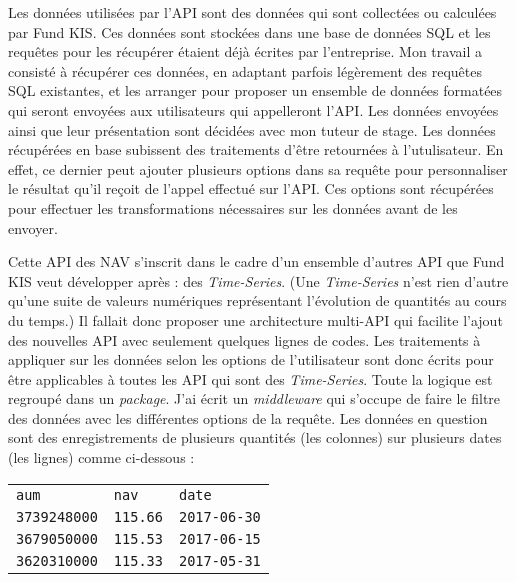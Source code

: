\vspace{3mm}

Les données utilisées par l'API sont des données qui sont collectées ou calculées par Fund KIS. Ces données sont stockées dans une base de données SQL et les requêtes pour les récupérer étaient déjà écrites par l'entreprise. Mon travail a consisté à récupérer ces données, en adaptant parfois légèrement des requêtes SQL existantes, et les arranger pour proposer un ensemble de données formatées qui seront envoyées aux utilisateurs qui appelleront l'API. Les données envoyées ainsi que leur présentation sont décidées avec mon tuteur de stage. Les données récupérées en base subissent des traitements d'être retournées à l'utulisateur. En effet, ce dernier peut ajouter plusieurs options dans sa requête pour personnaliser le résultat qu'il reçoit de l'appel effectué sur l'API. Ces options sont récupérées pour effectuer les transformations nécessaires sur les données avant de les envoyer.

\vspace{3mm}

Cette API des NAV s'inscrit dans le cadre d'un ensemble d'autres API que Fund KIS veut développer après : des \textit{Time-Series}. (Une \textit{Time-Series} n'est rien d'autre qu'une suite de valeurs numériques représentant l'évolution de quantités au cours du temps.) Il fallait donc proposer une architecture multi-API qui facilite l'ajout des nouvelles API avec seulement quelques lignes de codes. Les traitements à appliquer sur les données selon les options de l'utilisateur sont donc écrits pour être applicables à toutes les API qui sont des \textit{Time-Series}. Toute la logique est regroupé dans un \textit{package}. J'ai écrit un \textit{middleware} qui s'occupe de faire le filtre des données avec les différentes options de la requête. Les données en question sont des enregistrements de plusieurs quantités (les colonnes) sur plusieurs dates (les lignes) comme ci-dessous :

\vspace{3mm}

\begin{tabular}{lll}
\centering
\texttt{aum} & \texttt{nav} & \texttt{date} \\
\texttt{3739248000} & \texttt{115.66} & \texttt{2017-06-30} \\
\texttt{3679050000} & \texttt{115.53} & \texttt{2017-06-15} \\
\texttt{3620310000} & \texttt{115.33} & \texttt{2017-05-31} \\
\end{tabular}


